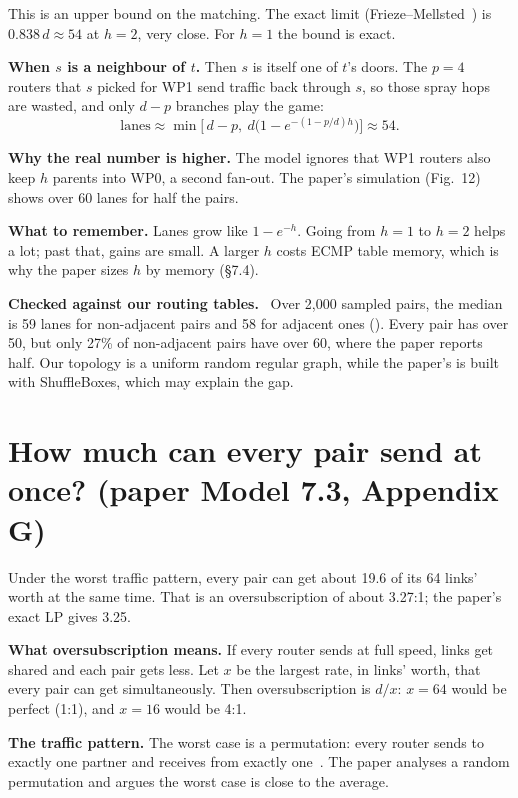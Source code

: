 \documentclass[11pt]{article}
\newcommand{\file}[1]{\path{#1}}
\newenvironment{checked}
  {\par\smallskip\noindent\begin{lrbox}{\checkedbox}%
   \begin{minipage}{\dimexpr\linewidth-2\fboxsep\relax}%
   \textbf{Checked against our routing tables.}\ }
  {\end{minipage}\end{lrbox}\colorbox{black!5}{\usebox{\checkedbox}}\par\smallskip}
\begin{document}
This is an upper bound on the matching. The exact limit (Frieze--Mellsted~\cite{frieze}) is $0.838\,d \approx 54$ at $h = 2$, very close. For $h = 1$ the bound is exact.

\textbf{When $s$ is a neighbour of $t$.} Then $s$ is itself one of $t$'s doors. The $p = 4$ routers that $s$ picked for WP1 send traffic back through $s$, so those spray hops are wasted, and only $d - p$ branches play the game:
\[
\text{lanes} \approx \min\!\Big[\, d - p,\ d \big(1 - e^{-(1 - p/d) h}\big) \Big] \approx 54.
\]

\textbf{Why the real number is higher.} The model ignores that WP1 routers also keep $h$ parents into WP0, a second fan-out. The paper's simulation (Fig.~12) shows over 60 lanes for half the pairs.

\textbf{What to remember.} Lanes grow like $1 - e^{-h}$. Going from $h = 1$ to $h = 2$ helps a lot; past that, gains are small. A larger $h$ costs ECMP table memory, which is why the paper sizes $h$ by memory (§7.4).

\begin{checked}
Over 2,000 sampled pairs, the median is 59 lanes for non-adjacent pairs and 58 for adjacent ones (\file{docs/VERIFICATION.md}). Every pair has over 50, but only 27\% of non-adjacent pairs have over 60, where the paper reports half. Our topology is a uniform random regular graph, while the paper's is built with ShuffleBoxes, which may explain the gap.
\end{checked}

\section{How much can every pair send at once? (paper Model 7.3, Appendix G)}

Under the worst traffic pattern, every pair can get about 19.6 of its 64 links' worth at the same time. That is an oversubscription of about 3.27:1; the paper's exact LP gives 3.25.

\textbf{What oversubscription means.} If every router sends at full speed, links get shared and each pair gets less. Let $x$ be the largest rate, in links' worth, that every pair can get simultaneously. Then oversubscription is $d / x$: $x = 64$ would be perfect (1:1), and $x = 16$ would be 4:1.

\textbf{The traffic pattern.} The worst case is a permutation: every router sends to exactly one partner and receives from exactly one~\cite{namyar}. The paper analyses a random permutation and argues the worst case is close to the average.
\end{document}
